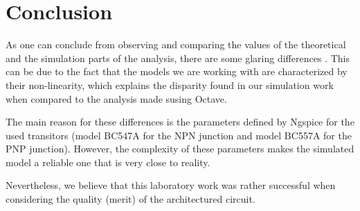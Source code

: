 \section{Conclusion}
\label{sec:conclusion}

\par As one can conclude from observing and comparing the values of the theoretical and the simulation parts of the analysis, there are some glaring differences . This can be due to the fact that the models we are working with are characterized by their non-linearity, which explains the disparity found in our simulation work when compared to the analysis made susing Octave. 

\par The main reason for these differences is the parameters defined by Ngspice for the used transitors (model BC547A for the NPN junction and model BC557A for the PNP junction). However, the complexity of these parameters makes the simulated model a reliable one that is very close to reality.

\par Nevertheless, we believe that this laboratory work was rather successful when considering the quality (merit) of the architectured circuit.
